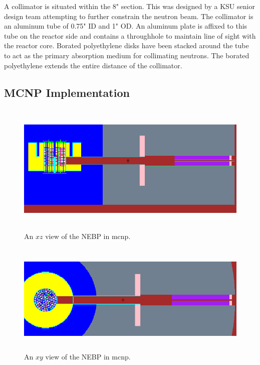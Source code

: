 A collimator is situated within the 8" section.
This was designed by a KSU senior design team attempting to further constrain the neutron beam.
The collimator is an aluminum tube of 0.75" ID and 1" OD.
An aluminum plate is affixed to this tube on the reactor side and contains a throughhole to maintain line of sight with the reactor core.
Borated polyethylene disks have been stacked around the tube to act as the primary absorption medium for collimating neutrons.
The borated polyethylene extends the entire distance of the collimator. 


\subsection{MCNP Implementation}

\begin{figure}[htb]
\centering
\includegraphics[height=2.5in]{tex/figures/mcnp_newxz.png}
\caption[MCNP NEBP $XZ$]{An $xz$ view of the NEBP in mcnp.}
\label{fig:mcnp_newxz}
\end{figure}

\begin{figure}[htb]
\centering
\includegraphics[height=2.1in]{tex/figures/mcnp_newxy.png}
\caption[MCNP NEBP $XY$]{An $xy$ view of the NEBP in mcnp.}
\label{fig:mcnp_newxy}
\end{figure}


